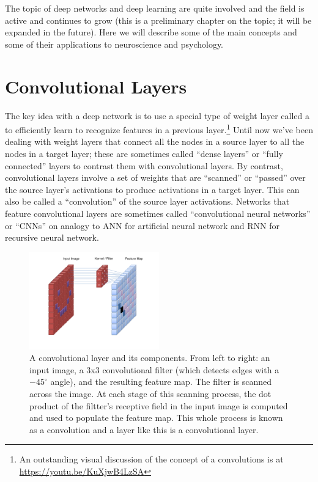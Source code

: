 The topic of deep networks and deep learning are quite involved and the field is active and continues to grow (this is a preliminary chapter on the topic; it will be expanded in the future). Here we will describe some of the main concepts and some of their applications to neuroscience and psychology.

\section{Convolutional Layers}\label{convolutionalLayer}


The key idea with a deep network is to use a special type of weight layer called a  to efficiently learn to recognize features in a previous layer.\footnote{An outstanding visual discussion of the concept of a convolutions is at \url{https://youtu.be/KuXjwB4LzSA}} Until now we've been dealing with weight layers that connect all the nodes in a source layer to all the nodes in a target layer; these are sometimes called ``dense layers'' or ``fully connected'' layers to contrast them with convolutional layers. By contrast, convolutional layers involve a set of weights that are ``scanned'' or ``passed'' over the source layer's activations to produce activations in a target layer. This can also be called a ``convolution'' of the source layer activations. Networks that feature convolutional layers are sometimes called ``convolutional neural networks'' or ``CNNs'' on analogy to ANN for artificial neural network and RNN for recursive neural network.

\begin{figure}[h]
\centering
\includegraphics[width=0.5\textwidth]{images/CNN_Filter.png}
\caption[User Cecbur, \url{https://commons.wikimedia.org/wiki/File:Convolutional_Neural_Network_NeuralNetworkFilter.gif}, with labels added by Jeff Yoshimi.]{A convolutional layer and its components. From left to right: an input image, a 3x3 convolutional filter (which detects edges with a $-45^\circ$ angle), and the resulting feature map. The filter is scanned across the image. At each stage of this scanning process, the dot product of the filtter's receptive field in the input image is computed and used to populate the feature map. This whole process is known as a convolution and a layer like this is a convolutional layer.}
\label{cnn_filter}
\end{figure}

